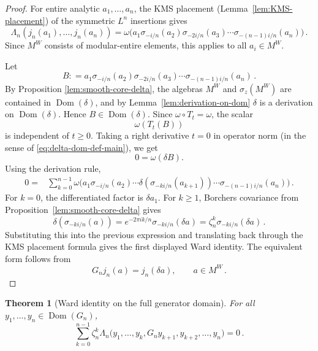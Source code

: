 \documentclass[11pt,a4paper]{article}
\theoremstyle{plain}
\newtheorem{theorem}{Theorem}
\numberwithin{theorem}{section}
\theoremstyle{definition}
\newcommand{\?}{\overset{?}{=}}
\newcommand{\defeq}{\mathrel{\mathop:}=}
\DeclareMathOperator{\Dom}{Dom}
\begin{document}
\begin{proof}
For entire analytic $a_1,\ldots,a_n$, the KMS placement (Lemma~\ref{lem:KMS-placement}) of the symmetric $L^n$ insertions gives
\begin{equation*}
  \Lambda_n(j_n(a_1),\ldots,j_n(a_n))
  =\omega\bigl(a_1\sigma_{-i/n}(a_2)\sigma_{-2i/n}(a_3)\cdots\sigma_{-(n-1)i/n}(a_n)\bigr)\,.
\end{equation*}
Since $M^W$ consists of modular-entire elements, this applies to all $a_i\in M^W$.

Let
\begin{equation*}
  B\defeq a_1\sigma_{-i/n}(a_2)\sigma_{-2i/n}(a_3)\cdots\sigma_{-(n-1)i/n}(a_n)\,.
\end{equation*}
By Proposition \ref{lem:smooth-core-delta}, the algebras $M^W$ and $\sigma_z(M^W)$ are contained in $\Dom(\delta)$, and by Lemma~\ref{lem:derivation-on-dom} $\delta$ is a derivation on $\Dom(\delta)$.  Hence $B\in\Dom(\delta)$.  Since $\omega\circ T_t=\omega$, the scalar
\begin{equation*}
  \omega(T_t(B))
\end{equation*}
 is independent of $t\geq 0$.  Taking a right derivative $t=0$ in operator norm (in the sense of \eqref{eq:delta-dom-def-main}), we get
\begin{equation*}
  0=\omega(\delta B).
\end{equation*}
Using the derivation rule,
\begin{align*}
  0
  ={}&\sum_{k=0}^{n-1}
  \omega\bigl(
    a_1\sigma_{-i/n}(a_2)\cdots
    \delta(\sigma_{-ki/n}(a_{k+1}))
    \cdots\sigma_{-(n-1)i/n}(a_n)
  \bigr)\,.
\end{align*}
For $k=0$, the differentiated factor is $\delta a_1$.  For $k\geq 1$, Borchers covariance from Proposition~\ref{lem:smooth-core-delta} gives
\begin{equation*}
  \delta(\sigma_{-ki/n}(a))
  =e^{-2\pi ik/n}\sigma_{-ki/n}(\delta a)
  =\zeta_n^k\sigma_{-ki/n}(\delta a)\,.
\end{equation*}
Substituting this into the previous expression and translating back through the KMS placement formula gives the first displayed Ward identity.  The equivalent form follows from
\begin{equation*}
  G_nj_n(a)=j_n(\delta a),\qquad a\in M^W\,.
\end{equation*}
\end{proof}

\begin{theorem}[Ward identity on the full generator domain]
\label{thm:full-domain-ward-fixed}
For all $y_1,\ldots,y_n\in\Dom(G_n)$,
\begin{equation}\label{eq:full-domain-ward-fixed}
    \sum_{k=0}^{n-1}\zeta_n^k
  \Lambda_n\bigl(
    y_1,\ldots,y_k,G_ny_{k+1},y_{k+2},\ldots,y_n
  \bigr)=0\,.
\end{equation}
\end{theorem}
\end{document}
